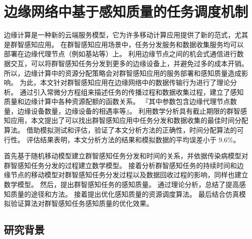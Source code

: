 
\chapter{边缘网络中基于感知质量的任务调度机制}


边缘计算是一种新的云端服务模型，它为许多移动计算应用提供了新的范式，尤其是群智感知应用。
在群智感知应用场景中，任务分发服务和数据收集服务均可以部署在边缘代理节点（例如基站等）上。
利用边缘节点之间的机会式通信进行数据交互，可以将群智感知任务分发到更多的边缘设备上，并避免过多的成本开销。
所以，边缘计算中的资源分配策略会对群智感知应用的服务部署和感知质量造成影响。
为此，本文针对群智感知应用在边缘网络中的数据传输行为进行了理论分析。
通过引入常微分方程组来描述任务的传播过程和数据收集过程，建立了感知质量和边缘计算中各种资源配额的函数关系。
『其中参数包含边缘代理节点数量，边缘设备数量，边缘设备的相遇率等』。
利用数学分析具有截止期限的群智感知应用，本文提出了可以找出群智感知应用中任务分发和数据收集的最佳时间分配算法。
借助模拟测试和评估，验证了本文分析方法的正确性，时间分配算法的可行性。
评估结果表明，本文分析方法的结果和模拟数据的平均误差小于 9.6\%。

首先基于随机移动模型建立群智感知任务分发和时间的关系，并依据传染病模型对群智感知任务分发的过程建立数学模型。
接着分析群智感知任务的持续时间和边缘节点的移动模型对群智感知任务分发过程以及数据回收过程的影响，同样也建立数学模型。
然后，提出群智感知任务的感知质量。
通过理论分析，总结了提高感知质量的途径和方法。
接着提出优化感知质量的资源调度算法。
最后结合仿真模拟验证算法对群智感知任务感知质量的优化效果。

\section{研究背景}

